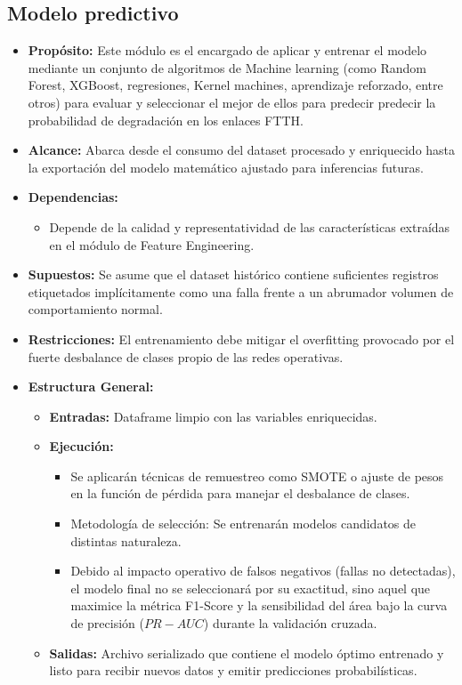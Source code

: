 \documentclass[12pt,a4paper]{article}
\begin{document}
    \subsection{Modelo predictivo}
    \label{subsec:modelo}
    \begin{itemize}
        \item \textbf{Propósito:} Este módulo es el encargado de aplicar y entrenar el modelo mediante un conjunto de algoritmos de Machine learning (como Random Forest, XGBoost, regresiones, Kernel machines, aprendizaje reforzado, entre otros) para evaluar y seleccionar el mejor de ellos para predecir
        predecir la probabilidad de degradación en los enlaces FTTH.

        \item \textbf{Alcance:} Abarca desde el consumo del dataset procesado y enriquecido hasta la exportación del modelo matemático ajustado para inferencias futuras.
        \item \textbf{Dependencias:}
        \begin{itemize}
            \item Depende de la calidad y representatividad de las características extraídas en el módulo de Feature Engineering.
        \end{itemize}
        \item \textbf{Supuestos:} Se asume que el dataset histórico contiene suficientes registros etiquetados implícitamente como una falla frente a un abrumador volumen de comportamiento normal.
        \item \textbf{Restricciones:} El entrenamiento debe mitigar el overfitting provocado por el fuerte desbalance de clases propio de las redes operativas.
        \item \textbf{Estructura General:}
        \begin{itemize}
            \item \textbf{Entradas:} Dataframe limpio con las variables enriquecidas.
            \item \textbf{Ejecución:}
            \begin{itemize}
                \item Se aplicarán técnicas de remuestreo como SMOTE o ajuste de pesos en la función de pérdida para manejar el desbalance de clases.
                \item Metodología de selección: Se entrenarán modelos candidatos de distintas naturaleza.
                \item Debido al impacto operativo de falsos negativos (fallas no detectadas), el modelo final no se seleccionará por su exactitud, sino aquel que maximice la métrica 
                F1-Score y la sensibilidad del área bajo la curva de precisión ($PR-AUC$) durante la validación cruzada.
            \end{itemize}
            \item \textbf{Salidas:} Archivo serializado que contiene el modelo óptimo entrenado y listo para recibir nuevos datos y emitir predicciones probabilísticas.
        \end{itemize}
    \end{itemize}
\end{document}
